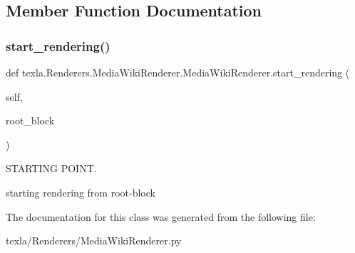 \subsection{Member Function Documentation}
\hypertarget{classtexla_1_1Renderers_1_1MediaWikiRenderer_1_1MediaWikiRenderer_a1f90d864abf95f0d477a699602dd9f32}{}\label{classtexla_1_1Renderers_1_1MediaWikiRenderer_1_1MediaWikiRenderer_a1f90d864abf95f0d477a699602dd9f32} 
\subsubsection{\texorpdfstring{start\+\_\+rendering()}{start\_rendering()}}
{\footnotesize\ttfamily def texla.\+Renderers.\+Media\+Wiki\+Renderer.\+Media\+Wiki\+Renderer.\+start\+\_\+rendering (\begin{DoxyParamCaption}\item[{}]{self,  }\item[{}]{root\+\_\+block }\end{DoxyParamCaption})}



S\+T\+A\+R\+T\+I\+NG P\+O\+I\+NT. 

\begin{DoxyVerb}starting rendering from root-block\end{DoxyVerb}
 

The documentation for this class was generated from the following file\+:\begin{DoxyCompactItemize}
\item 
texla/\+Renderers/Media\+Wiki\+Renderer.\+py\end{DoxyCompactItemize}
